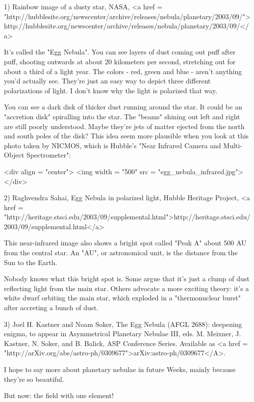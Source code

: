 1) Rainbow image of a dusty star, NASA, 
<a href = "http://hubblesite.org/newscenter/archive/releases/nebula/planetary/2003/09/">http://hubblesite.org/newscenter/archive/releases/nebula/planetary/2003/09/</a>

It's called the "Egg Nebula".  You can see layers of dust coming out
puff after puff, shooting outwards at about 20 kilometers per second,
stretching out for about a third of a light year.  The colors - red,
green and blue - aren't anything you'd actually see.  They're just  
an easy way to depict three different polarizations of light.  I 
don't know why the light is polarized that way.

You can see a dark disk of thicker dust running around 
the star.  It could be an "accretion disk" spiralling into the star.  The 
"beams" shining out left and right are still poorly understood.  
Maybe they're jets of matter ejected from the north and south 
poles of the disk?  This idea seem more plausible when you look at 
this photo taken by NICMOS, which is Hubble's "Near Infrared Camera 
and Multi-Object Spectrometer":

<div align = "center">
<img width = "500" src = "egg_nebula_infrared.jpg">
</div>


2) Raghvendra Sahai, Egg Nebula in polarized light, Hubble Heritage
Project, <a href = "http://heritage.stsci.edu/2003/09/supplemental.html">http://heritage.stsci.edu/2003/09/supplemental.html</a>

This near-infrared image also shows a bright spot called "Peak
A" about 500 AU from the central star.  An "AU", or
astronomical unit, is the distance from the Sun to the Earth.

Nobody knows what this bright spot is.  Some argue that it's just a 
clump of dust reflecting light from the main star.  Others advocate a 
more exciting theory: it's a white dwarf orbiting the main star, which 
exploded in a "thermonuclear burst" after accreting a bunch of dust.

3) Joel H. Kastner and Noam Soker, The Egg Nebula (AFGL 2688): deepening 
enigma, to appear in Asymmetrical Planetary Nebulae III, eds. M. Meixner, 
J. Kastner, N. Soker, and B. Balick, ASP Conference Series.  Available 
as <a href = "http://arXiv.org/abs/astro-ph/0309677">arXiv:astro-ph/0309677</A>. 

I hope to say more about planetary nebulae in future Weeks, mainly because
they're so beautiful.

But now: the field with one element!


